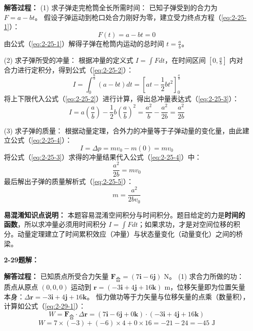 \textbf{解答过程：}
(1) 求子弹走完枪筒全长所需时间：
已知子弹受到的合力为 $F = a - bt$。
假设子弹运动到枪口处合力刚好为零，建立受力终点方程（\ref{eq:2-25-1}）：
\begin{equation}\label{eq:2-25-1}
	F(t) = a - bt = 0
\end{equation}
由公式（\ref{eq:2-25-1}）解得子弹在枪筒内运动的总时间 $t = \frac{a}{b}$。

(2) 求子弹所受的冲量：
根据冲量的定义式 $I = \int F dt$，在时间区间 $[0, \frac{a}{b}]$ 内对合力进行定积分，得到公式（\ref{eq:2-25-2}）：
\begin{equation}\label{eq:2-25-2}
	I = \int_{0}^{\frac{a}{b}} (a - bt) dt = \left[ at - \frac{1}{2}bt^2 \right]_{0}^{\frac{a}{b}}
\end{equation}
将上下限代入公式（\ref{eq:2-25-2}）进行计算，得出总冲量表达式（\ref{eq:2-25-3}）：
\begin{equation}\label{eq:2-25-3}
	I = a\left(\frac{a}{b}\right) - \frac{1}{2}b\left(\frac{a}{b}\right)^2 = \frac{a^2}{b} - \frac{a^2}{2b} = \frac{a^2}{2b}
\end{equation}

(3) 求子弹的质量：
根据动量定理，合外力的冲量等于子弹动量的变化量，由此建立公式（\ref{eq:2-25-4}）：
\begin{equation}\label{eq:2-25-4}
	I = \Delta p = mv_0 - m(0) = mv_0
\end{equation}
将公式（\ref{eq:2-25-3}）求得的冲量结果代入公式（\ref{eq:2-25-4}）中：
$$\frac{a^2}{2b} = mv_0$$
最后解出子弹的质量解析式（\ref{eq:2-25-5}）：
\begin{equation}\label{eq:2-25-5}
	m = \frac{a^2}{2bv_0}
\end{equation}

\textbf{易混淆知识点说明：}
本题容易混淆空间积分与时间积分。题目给定的力是\textbf{时间的函数}，所以求冲量必须用时间积分 $I = \int F dt$；如果求功，才是对空间位移的积分。动量定理建立了时间累积效应（冲量）与状态量变化（动量变化）之间的桥梁。

\vspace{2em}

\textbf{2-29题解：}
\setcounter{equation}{0}
\renewcommand{\theHequation}{2-29.\arabic{equation}}

\textbf{解答过程：}
已知质点所受合力矢量 $\mathbf{F}_{\text{合}} = (7\mathbf{i} - 6\mathbf{j})\text{ N}$。
(1) 求合力所做的功：
质点从原点 $(0,0,0)$ 运动到 $\mathbf{r} = (-3\mathbf{i} + 4\mathbf{j} + 16\mathbf{k})\text{ m}$，位移矢量即为位置矢量本身：$\Delta\mathbf{r} = -3\mathbf{i} + 4\mathbf{j} + 16\mathbf{k}$。
恒力做功等于力矢量与位移矢量的点乘（数量积），计算如公式（\ref{eq:2-29-1}）：
\begin{equation}\label{eq:2-29-1}
	W = \mathbf{F}_{\text{合}} \cdot \Delta\mathbf{r} = (7\mathbf{i} - 6\mathbf{j} + 0\mathbf{k}) \cdot (-3\mathbf{i} + 4\mathbf{j} + 16\mathbf{k})
\end{equation}
$$W = 7 \times (-3) + (-6) \times 4 + 0 \times 16 = -21 - 24 = -45\text{ J}$$

